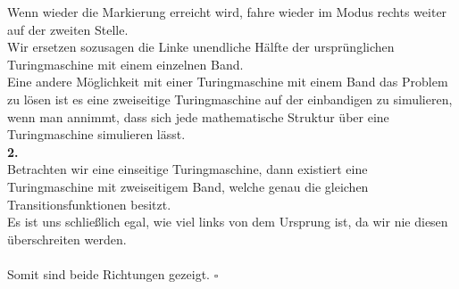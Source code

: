 \documentclass[12pt, a4paper]{article}
\newcommand*{\qed}{\null\nobreak\hfill\ensuremath{\square}}
\begin{document}
Wenn wieder die Markierung erreicht wird, fahre wieder im  Modus rechts weiter auf der zweiten Stelle. \\
Wir ersetzen sozusagen die Linke unendliche Hälfte der ursprünglichen Turingmaschine mit einem einzelnen Band. \\
Eine andere Möglichkeit mit einer Turingmaschine mit einem Band das Problem zu lösen ist es eine zweiseitige Turingmaschine auf der einbandigen zu simulieren, wenn man annimmt, dass sich jede mathematische Struktur über eine Turingmaschine simulieren lässt.\\
\textbf{2. } \textquote{\(\Leftarrow\)} \\
Betrachten wir eine einseitige Turingmaschine, dann existiert eine Turingmaschine mit zweiseitigem Band, welche genau die gleichen Transitionsfunktionen besitzt. \\
Es ist uns schließlich egal, wie viel  links von dem Ursprung ist, da wir nie diesen überschreiten werden. \\
\\
Somit sind beide Richtungen gezeigt. \qed
\end{document}
